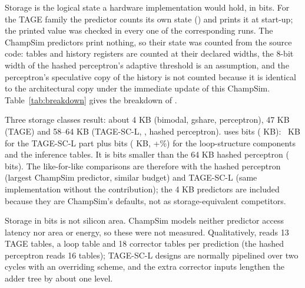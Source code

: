Storage is the logical state a hardware implementation would hold, in bits. For the TAGE family the predictor counts its own state () and prints it at start-up; the printed value was checked in every one of the corresponding runs. The ChampSim predictors print nothing, so their state was counted from the source code: tables and history registers are counted at their declared widths, the 8-bit width of the hashed perceptron's adaptive threshold is an assumption, and the perceptron's speculative copy of the history is not counted because it is identical to the architectural copy under the immediate update of this ChampSim. Table~\ref{tab:breakdown} gives the breakdown of \prop{}.

Three storage classes result: about 4 KB (bimodal, gshare, perceptron), 47 KB (TAGE) and 58--64 KB (TAGE-SC-L, \prop{}, hashed perceptron). \prop{} uses  bits ( KB): ~KB for the TAGE-SC-L part plus  bits ( KB, +\%) for the loop-structure components and the inference tables. It is  bits smaller than the 64 KB hashed perceptron ( bits). The like-for-like comparisons are therefore with the hashed perceptron (largest ChampSim predictor, similar budget) and TAGE-SC-L (same implementation without the contribution); the 4 KB predictors are included because they are ChampSim's defaults, not as storage-equivalent competitors.

Storage in bits is not silicon area. ChampSim models neither predictor access latency nor area or energy, so these were not measured. Qualitatively, \prop{} reads 13 TAGE tables, a loop table and 18 corrector tables per prediction (the hashed perceptron reads 16 tables); TAGE-SC-L designs are normally pipelined over two cycles with an overriding scheme, and the extra corrector inputs lengthen the adder tree by about one level.
